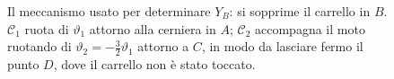 \begin{figure}[htbp]
\caption{Il meccanismo usato per determinare $Y_B$: si sopprime il
carrello in $B$. $\mathcal{C}_1$ ruota di $\vartheta_1$ attorno alla
cerniera in $A$; $\mathcal{C}_2$ accompagna il moto ruotando di
$\vartheta_2=-\tfrac32\vartheta_1$ attorno a $C$, in modo da lasciare
fermo il punto $D$, dove il carrello non è stato toccato.}
\label{fig:gerber_mecc_B}
\end{figure}
